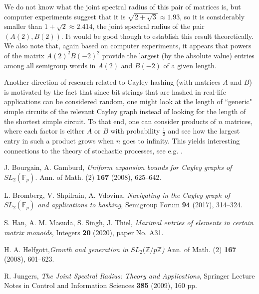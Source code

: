 \documentclass{lmsedition}
\newcommand{\Z}{\mathbb{Z}}
\newcommand{\F}{\mathbb{F}}
\begin{document}
\begin{twoblock}
We do not know what the joint spectral radius of this pair of matrices is, but computer experiments suggest that it is $\sqrt{2+\sqrt{3}} \approx 1.93$, so it is considerably smaller than $1+\sqrt{2} \approx 2.414$, the joint spectral radius of the pair $(A(2), B(2))$.
It would be good though to establish this result theoretically. We also note that, again based on computer experiments, it appears that powers of the matrix $A(2)^2B(-2)^2$ provide the largest (by the absolute value) entries among all semigroup words in $A(2)$ and $B(-2)$ of a given length.

Another direction of research related to Cayley hashing (with matrices $A$ and $B$) is motivated by the fact that since bit strings that are hashed in real-life applications can be considered random, one might look at the length of ``generic"  simple circuits of the relevant Cayley graph instead of looking for the length of the shortest simple circuit. To that end, one can consider products of $n$ matrices, where each factor is either $A$ or $B$ with probability $\frac{1}{2}$ and see how the largest entry in such a product grows when $n$ goes to infinity. This yields interesting connections to the theory of stochastic processes, see e.g. \cite{Pollicott}.


 
 
 
 


 
 
\begin{thebibliography}{ABC}
 
J. Bourgain, A. Gamburd, {\it Uniform expansion bounds for Cayley
graphs of $SL_2(\F_p)$}. Ann. of Math. (2) {\bf 167}
(2008),  625--642.

L. Bromberg, V. Shpilrain, A. Vdovina, {\it
Navigating in the Cayley graph of $SL_2(\F_p)$ and applications to
hashing}, Semigroup Forum {\bf 94} (2017), 314--324.
 

S. Han, A. M. Masuda, S. Singh, J. Thiel, {\it Maximal entries of elements
in certain matrix monoids}, Integers {\bf 20} (2020), paper No. A31.

H. A. Helfgott,{\it Growth and generation in $SL_2(\Z/p\Z$)} Ann. of
Math. (2) {\bf 167} (2008),  601--623.

R. Jungers, {\sl The Joint Spectral Radius: Theory and Applications}, Springer Lecture Notes in Control and Information Sciences {\bf 385}  (2009), 160 pp.


\end{thebibliography}
\end{twoblock}
\end{document}
